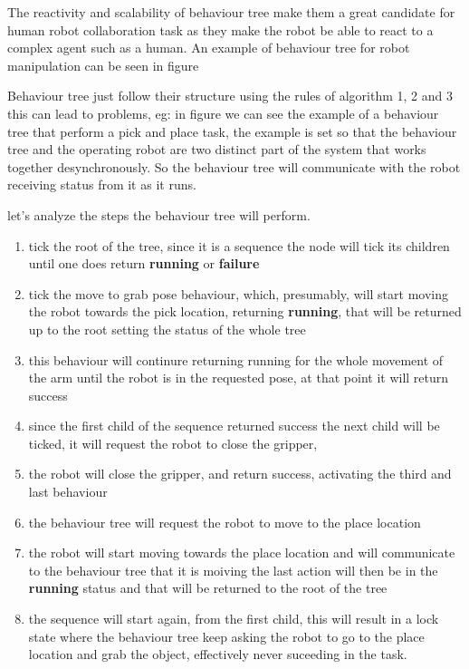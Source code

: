 \begin{itemize}
The reactivity and scalability of behaviour tree make them a great candidate for human robot collaboration task as they
make the robot be able to react to a complex agent such as a human. An example of behaviour tree for robot manipulation 
can be seen in figure 

Behaviour tree just follow their structure using the rules of algorithm 1, 2 and 3 
this can lead to problems, eg: in figure  we can see the
example of a behaviour tree that perform a pick and place task, the example is set so that the behaviour tree and the 
operating robot are two distinct part of the system that works together desynchronously. So the behaviour tree will 
communicate with the robot receiving status from it as it runs.

let's analyze the steps the behaviour tree will perform.

\begin{enumerate}
  \item tick the root of the tree, since it is a sequence the node will tick its children until one does return \textbf{running} 
        or \textbf{failure} 
  \item tick the move to grab pose behaviour, which, presumably, will start moving the robot towards the pick location,
        returning \textbf{running}, that will be returned up to the root setting the status of the whole tree
  \item this behaviour will continure returning running for the whole movement of the arm until the robot is in the 
        requested pose, at that point it will return success
  \item since the first child of the sequence returned success the next child will be ticked, it will request the robot
        to close the gripper, 
  \item the robot will close the gripper, and return success, activating the third and last behaviour
  \item the behaviour tree will request the robot to move to the place location
  \item the robot will start moving towards the place location and will communicate to the behaviour tree that it is moiving
        the last action will then be in the \textbf{running} status and that will be returned to the root of the tree
  \item the sequence will start again, from the first child, this will result in a lock state where the behaviour tree
        keep asking the robot to go to the place location and grab the object, effectively never suceeding in the task.
\end{enumerate}


\end{itemize}
